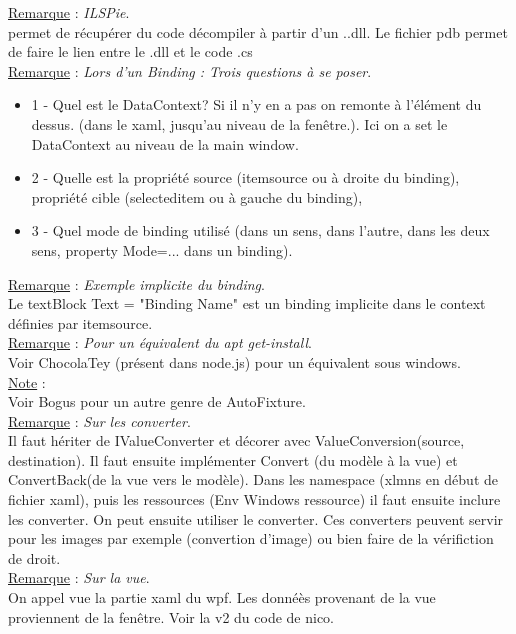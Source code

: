 \documentclass[a4paper,12pt,twoside]{article}
\newcommand{\rem}[2]{\noindent\underline{Remarque} : \textit{#1}.\\ \indent #2}
\newcommand{\note}[1]{\noindent\underline{Note} : \\ \indent #1}
\begin{document}
\rem{ILSPie}{permet de récupérer du code décompiler à partir d'un ..dll. Le fichier pdb permet de faire le lien entre le .dll et le code .cs}\\

\rem{Lors d'un Binding : Trois questions à se poser}{\begin{itemize}
\item 1 - Quel est le DataContext? Si il n'y en a pas on remonte à l'élément du dessus. (dans le xaml, jusqu'au niveau de la fenêtre.). Ici on a set le DataContext au niveau de la main window.
\item 2 - Quelle est la propriété source (itemsource ou à droite du binding), propriété cible (selecteditem ou à gauche du binding),
\item 3 - Quel mode de binding utilisé (dans un sens, dans l'autre, dans les deux sens, property Mode=... dans un binding).\\
\end{itemize}}

\rem{Exemple implicite du binding}{Le textBlock Text = "{Binding Name}" est un binding implicite dans le context définies par itemsource}.\\

\rem{Pour un équivalent du apt get-install}{Voir ChocolaTey (présent dans node.js) pour un équivalent sous windows.}\\

\note{Voir Bogus pour un autre genre de AutoFixture.}\\

\rem{Sur les converter}{Il faut hériter de IValueConverter et décorer avec ValueConversion(source, destination). Il faut ensuite implémenter Convert (du modèle à la vue) et ConvertBack(de la vue vers le modèle). Dans les namespace (xlmns en début de fichier xaml), puis les ressources (Env Windows ressource) il faut ensuite inclure les converter. On peut ensuite utiliser le converter. Ces converters peuvent servir pour les images par exemple (convertion d'image) ou bien faire de la vérifiction de droit.}\\

\rem{Sur la vue}{On appel vue la partie xaml du wpf. Les donnéès provenant de la vue proviennent de la fenêtre. Voir la v2 du code de nico.}\\


\newpage
\printglossary[type=\acronymtype]%
\glsaddallunused %
\printglossary[type = main,nonumberlist]%
\end{document}
